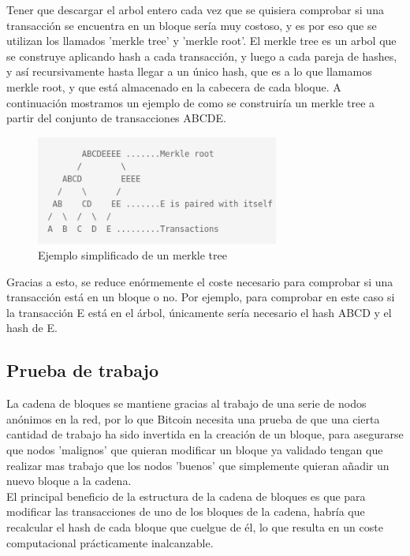 \documentclass[11pt,a4paper]{article}
\begin{document}

Tener que descargar el arbol entero cada vez que se quisiera comprobar si una transacción se encuentra en un bloque sería muy costoso, y es por eso que se utilizan los llamados 'merkle tree' y 'merkle root'. El merkle tree es un arbol que se construye aplicando hash a cada transacción, y luego a cada pareja de hashes, y así recursivamente hasta llegar a un único hash, que es a lo que llamamos merkle root, y que está almacenado en la cabecera de cada bloque. A continuación mostramos un ejemplo de como se construiría un merkle tree a partir del conjunto de transacciones ABCDE.

\begin{figure}[h]
	\includegraphics[width=8cm]{merkleroot.png}
	\centering		
	\caption{Ejemplo simplificado de un merkle tree}
	\label{p5}
\end{figure}

Gracias a esto, se reduce enórmemente el coste necesario para comprobar si una transacción está en un bloque o no. Por ejemplo, para comprobar en este caso si la transacción E está en el árbol, únicamente sería necesario el hash ABCD y el hash de E.\\

\subsection{Prueba de trabajo}
La cadena de bloques se mantiene gracias al trabajo de una serie de nodos anónimos en la red, por lo que Bitcoin necesita una prueba de que una cierta cantidad de trabajo ha sido invertida en la creación de un bloque, para asegurarse que nodos 'malignos' que quieran modificar un bloque ya validado tengan que realizar mas trabajo que los nodos 'buenos' que simplemente quieran añadir un nuevo bloque a la cadena.\\

El principal beneficio de la estructura de la cadena de bloques es que para modificar las transacciones de uno de los bloques de la cadena, habría que recalcular el hash de cada bloque que cuelgue de él, lo que resulta en un coste computacional prácticamente inalcanzable.\\
\end{document}

